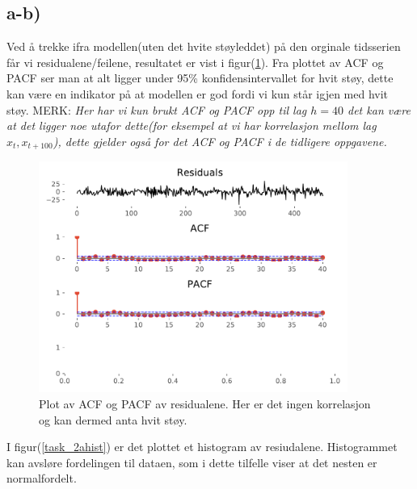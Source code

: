 \subsection{a-b)}

Ved å trekke ifra modellen(uten det hvite støyleddet) på den orginale tidsserien får vi residualene/feilene, resultatet er vist i figur(\ref{task_2a}). Fra plottet av ACF og PACF ser man at alt ligger under 95\% konfidensintervallet for hvit støy, dette kan være en indikator på at modellen er god fordi vi kun står igjen med hvit støy. MERK: \emph{Her har vi kun brukt ACF og PACF opp til lag $h = 40$ det kan være at det ligger noe utafor dette(for eksempel at vi har korrelasjon mellom lag $x_{t}, x_{t+100}$), dette gjelder også for det ACF og PACF i de tidligere oppgavene.}

\begin{figure}[hbt!]
    {\centering
        \includegraphics[width=0.90\textwidth]{task_2a.pdf}
        \caption{Plot av ACF og PACF av residualene. Her er det ingen korrelasjon og kan dermed anta hvit støy.}
        \label{task_2a}
    \par}
    \end{figure}

I figur(\ref{task_2ahist}) er det plottet et histogram av resiudalene. Histogrammet kan avsløre fordelingen til dataen, som i dette tilfelle viser at det nesten er normalfordelt.


